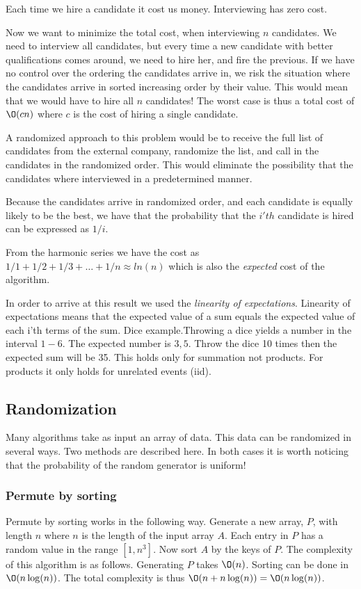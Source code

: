 \documentclass[10pt]{article}
\begin{document}
Each time we hire a candidate it cost us money. Interviewing has zero cost.

Now we want to minimize the total cost, when interviewing $n$ candidates. We need to interview all candidates, but every time a new candidate with better qualifications comes around, we need to hire her, and fire the previous. If we have no control over the ordering the candidates arrive in, we risk the situation where the candidates arrive in sorted increasing order by their value. This would mean that we would have to hire all $n$ candidates! The worst case is thus a total cost of $\O(cn)$ where $c$ is the cost of hiring a single candidate.

A randomized approach to this problem would be to receive the full list of candidates from the external company, randomize the list, and call in the candidates in the randomized order. This would eliminate the possibility that the candidates where interviewed in a predetermined manner.

Because the candidates arrive in randomized order, and each candidate is equally likely to be the best, we have that the probability that the $i'th$ candidate is hired can be expressed as $1/i$.

From the harmonic series we have the cost as $1/1+1/2+1/3+\ldots+1/n \approx ln(n)$ which is also the \emph{expected} cost of the algorithm. 

In order to arrive at this result we used the \emph{linearity of expectations}. Linearity of expectations means that the expected value of a sum equals the expected value of each i'th terms of the sum. Dice example.Throwing a dice yields a number in the interval $1-6$. The expected number is $3,5$. Throw the dice 10 times then the expected sum will be 35. This holds only for summation not products. For products it only holds for unrelated events (iid).



\subsection{Randomization} %
\label{sub:randomization}
Many algorithms take as input an array of data. This data can be randomized in several ways. Two methods are described here. In both cases it is worth noticing that the probability of the random generator is uniform! 

\subsubsection{Permute by sorting} %
\label{ssub:permute_by_sorting}
Permute by sorting works in the following way. Generate a new array, $P$, with length $n$ where $n$ is the length of the input array $A$. Each entry in $P$ has a random value in the range $[1,n^3]$. Now sort $A$ by the keys of $P$. The complexity of this algorithm is as follows. Generating $P$ takes $\O(n)$. Sorting can be done in $\O(n\log(n))$. The total complexity is thus $\O(n+n\log(n)) = \O(n\log(n))$.
\end{document}
